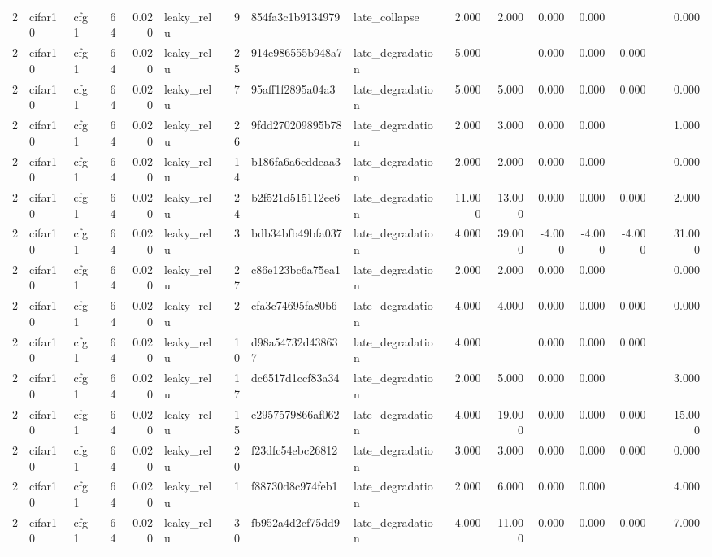 \begin{table}[htbp]
{\begin{tabular}{@{}rllrrlrllrrrrrrr@{}}
2 & cifar10 & cfg1 & 64 & 0.020 & leaky\_relu & 9 & 854fa3c1b9134979 & late\_collapse & 2.000 & 2.000 & 0.000 & 0.000 &  &  & 0.000 \\
2 & cifar10 & cfg1 & 64 & 0.020 & leaky\_relu & 25 & 914e986555b948a7 & late\_degradation & 5.000 &  & 0.000 & 0.000 & 0.000 &  &  \\
2 & cifar10 & cfg1 & 64 & 0.020 & leaky\_relu & 7 & 95aff1f2895a04a3 & late\_degradation & 5.000 & 5.000 & 0.000 & 0.000 & 0.000 &  & 0.000 \\
2 & cifar10 & cfg1 & 64 & 0.020 & leaky\_relu & 26 & 9fdd270209895b78 & late\_degradation & 2.000 & 3.000 & 0.000 & 0.000 &  &  & 1.000 \\
2 & cifar10 & cfg1 & 64 & 0.020 & leaky\_relu & 14 & b186fa6a6cddeaa3 & late\_degradation & 2.000 & 2.000 & 0.000 & 0.000 &  &  & 0.000 \\
2 & cifar10 & cfg1 & 64 & 0.020 & leaky\_relu & 24 & b2f521d515112ee6 & late\_degradation & 11.000 & 13.000 & 0.000 & 0.000 & 0.000 &  & 2.000 \\
2 & cifar10 & cfg1 & 64 & 0.020 & leaky\_relu & 3 & bdb34bfb49bfa037 & late\_degradation & 4.000 & 39.000 & -4.000 & -4.000 & -4.000 &  & 31.000 \\
2 & cifar10 & cfg1 & 64 & 0.020 & leaky\_relu & 27 & c86e123bc6a75ea1 & late\_degradation & 2.000 & 2.000 & 0.000 & 0.000 &  &  & 0.000 \\
2 & cifar10 & cfg1 & 64 & 0.020 & leaky\_relu & 2 & cfa3c74695fa80b6 & late\_degradation & 4.000 & 4.000 & 0.000 & 0.000 & 0.000 &  & 0.000 \\
2 & cifar10 & cfg1 & 64 & 0.020 & leaky\_relu & 10 & d98a54732d438637 & late\_degradation & 4.000 &  & 0.000 & 0.000 & 0.000 &  &  \\
2 & cifar10 & cfg1 & 64 & 0.020 & leaky\_relu & 17 & dc6517d1ccf83a34 & late\_degradation & 2.000 & 5.000 & 0.000 & 0.000 &  &  & 3.000 \\
2 & cifar10 & cfg1 & 64 & 0.020 & leaky\_relu & 15 & e2957579866af062 & late\_degradation & 4.000 & 19.000 & 0.000 & 0.000 & 0.000 &  & 15.000 \\
2 & cifar10 & cfg1 & 64 & 0.020 & leaky\_relu & 20 & f23dfc54ebc26812 & late\_degradation & 3.000 & 3.000 & 0.000 & 0.000 & 0.000 &  & 0.000 \\
2 & cifar10 & cfg1 & 64 & 0.020 & leaky\_relu & 1 & f88730d8c974feb1 & late\_degradation & 2.000 & 6.000 & 0.000 & 0.000 &  &  & 4.000 \\
2 & cifar10 & cfg1 & 64 & 0.020 & leaky\_relu & 30 & fb952a4d2cf75dd9 & late\_degradation & 4.000 & 11.000 & 0.000 & 0.000 & 0.000 &  & 7.000 \\

\end{tabular}}
\end{table}
